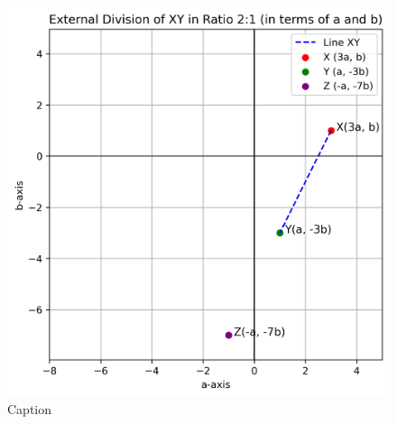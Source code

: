 \documentclass[journal]{IEEEtran}
\begin{document}
\begin{figure}
    \centering
    \includegraphics[width=0.8\linewidth]{figs/01.png}
    \caption{Caption}
    \label{fig:placeholder}
\end{figure}
\end{document}
